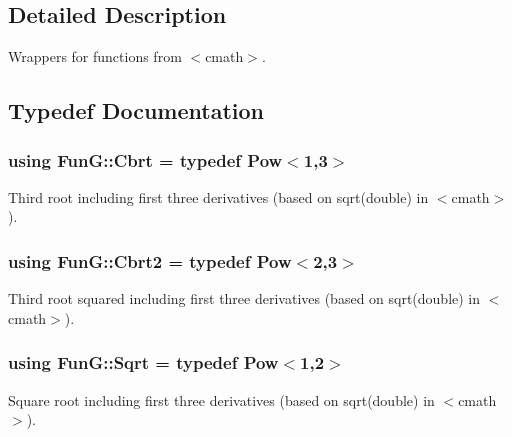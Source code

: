 \subsection{Detailed Description}
Wrappers for functions from $<$cmath$>$. 

\subsection{Typedef Documentation}
\hypertarget{group__CMathGroup_ga2e4363ad8400e1c8431c10de2152ec2b}{
\subsubsection[{Cbrt}]{\setlength{\rightskip}{0pt plus 5cm}using {\bf Fun\-G\-::\-Cbrt} = typedef Pow$<$1,3$>$}}\label{group__CMathGroup_ga2e4363ad8400e1c8431c10de2152ec2b}


Third root including first three derivatives (based on sqrt(double) in $<$cmath$>$). 

\hypertarget{group__CMathGroup_ga9bcbef859d7ffd0d6570d69e1bd8503a}{
\subsubsection[{Cbrt2}]{\setlength{\rightskip}{0pt plus 5cm}using {\bf Fun\-G\-::\-Cbrt2} = typedef Pow$<$2,3$>$}}\label{group__CMathGroup_ga9bcbef859d7ffd0d6570d69e1bd8503a}


Third root squared including first three derivatives (based on sqrt(double) in $<$cmath$>$). 

\hypertarget{group__CMathGroup_gaca80e773d5886f47cd49dc19b130263f}{
\subsubsection[{Sqrt}]{\setlength{\rightskip}{0pt plus 5cm}using {\bf Fun\-G\-::\-Sqrt} = typedef Pow$<$1,2$>$}}\label{group__CMathGroup_gaca80e773d5886f47cd49dc19b130263f}


Square root including first three derivatives (based on sqrt(double) in $<$cmath$>$). 



